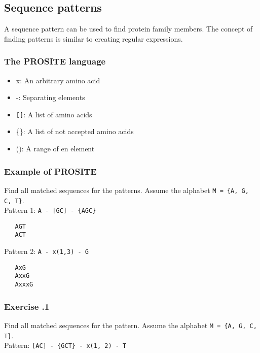 %
%

%
%
\subsection{Sequence patterns}
A sequence pattern can be used to find protein family members. The concept of finding patterns is similar to creating regular expressions.

%
%
\subsubsection*{The PROSITE language}
\begin{itemize}
\item x: An arbitrary amino acid
\item -: Separating elements
\item \verb|[]|: A list of amino acids
\item \{\}: A list of not accepted amino acids
\item (): A range of en element
\end{itemize}

%
%
\subsubsection*{Example of PROSITE}
Find all matched sequences for the patterns. Assume the alphabet \verb|M = {A, G, C, T}|. \\

\noindent
Pattern 1: \verb|A - [GC] - {AGC}|
\begin{verbatim}
   AGT
   ACT
\end{verbatim}

\noindent
Pattern 2: \verb|A - x(1,3) - G|
\begin{verbatim}
   AxG
   AxxG
   AxxxG
\end{verbatim}

%
%
\subsubsection*{Exercise \thesection.1}
Find all matched sequences for the pattern. Assume the alphabet \verb|M = {A, G, C, T}|. \\

\noindent
Pattern: \verb|[AC] - {GCT} - x(1, 2) - T|

\bigskip 

\bigskip 

\bigskip 

%
